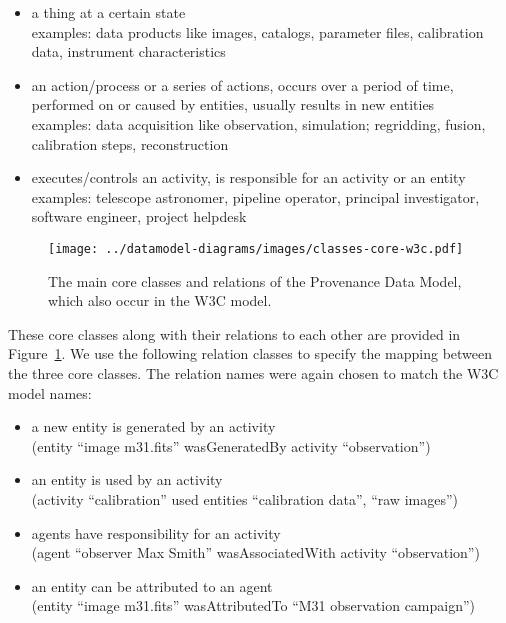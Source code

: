\begin{itemize}
\item {} a thing at a certain state\\
    examples: data products like images, catalogs, parameter files, calibration data, instrument characteristics

\item {} an action/process or a series of actions, occurs over a period of time, performed on or caused by entities, usually results in new entities\\
    examples: data acquisition like observation, simulation; regridding, fusion, calibration steps, reconstruction

\item {} executes/controls an activity, is responsible for an activity or an entity\\
    examples: telescope astronomer, pipeline operator, principal investigator, software engineer, project helpdesk

\end{itemize}

\noindent



\begin{figure}[h]
\centering
\texttt{[image: ../datamodel-diagrams/images/classes-core-w3c.pdf]}
\caption[Core classes and relations of the Provenance Data Model]{The main core classes and relations of the Provenance Data Model, which also occur in the W3C model.}
\label{fig:coreclasses}
\end{figure}

These core classes along with their relations to each other are provided in Figure~\ref{fig:coreclasses}.
We use the following relation classes to specify the mapping between the three core 
classes. 
The relation names were again chosen to match the W3C model names:
\begin{itemize}
\item {} a new entity is generated by an activity\\
        (entity ``image m31.fits'' wasGeneratedBy activity ``observation'')
\item {} an entity is used by an activity\\
        (activity ``calibration'' used entities ``calibration data'', ``raw images'')
\item {} agents have responsibility for an activity\\
        (agent ``observer Max Smith'' wasAssociatedWith activity ``observation'')
\item {} an entity can be attributed to an agent\\
        (entity ``image m31.fits'' wasAttributedTo ``M31 observation campaign'')
\end{itemize}

